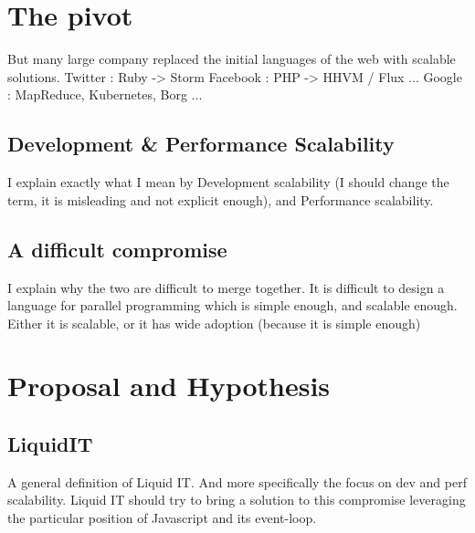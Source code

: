 \documentclass[12pt]{report}
\begin{document}
  \section{The pivot }

    But many large company replaced the initial languages of the web with scalable solutions.
    Twitter : Ruby -> Storm
    Facebook : PHP -> HHVM / Flux ...
    Google : MapReduce, Kubernetes, Borg ...

    \subsection{Development \& Performance Scalability}

    I explain exactly what I mean by Development scalability (I should change the term, it is misleading and not explicit enough), and Performance scalability.

    \subsection{A difficult compromise}

    I explain why the two are difficult to merge together.
    It is difficult to design a language for parallel programming which is simple enough, and scalable enough.
    Either it is scalable, or it has wide adoption (because it is simple enough)

  \section{Proposal and Hypothesis}

    \subsection{}


    \subsection{LiquidIT}

    A general definition of Liquid IT.
    And more specifically the focus on dev and perf scalability.
    Liquid IT should try to bring a solution to this compromise leveraging the particular position of Javascript and its event-loop.
\end{document}
